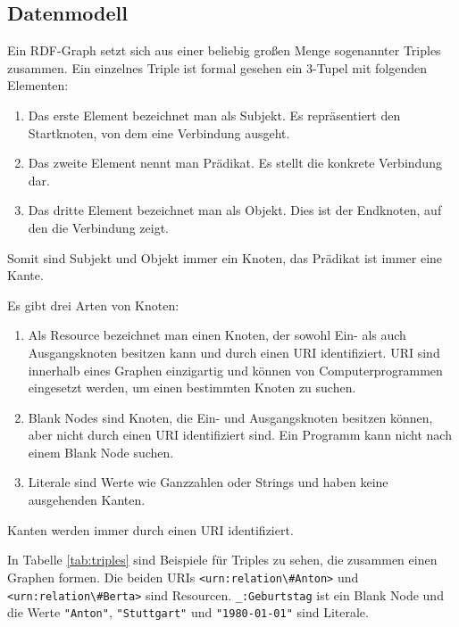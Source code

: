 \subsection{Datenmodell}

Ein RDF-Graph setzt sich aus einer beliebig großen Menge sogenannter Triples zusammen. \cite[vgl.][Sektion 3.1]{w3c2014rdfconcepts} Ein einzelnes Triple ist formal gesehen ein 3-Tupel mit folgenden Elementen:
\begin{enumerate}
	\item Das erste Element bezeichnet man als Subjekt. Es repräsentiert den Startknoten, von dem eine Verbindung ausgeht.
	\item Das zweite Element nennt man Prädikat. Es stellt die konkrete Verbindung dar.
	\item Das dritte Element bezeichnet man als Objekt. Dies ist der Endknoten, auf den die Verbindung zeigt. 
\end{enumerate}

Somit sind Subjekt und Objekt immer ein Knoten, das Prädikat ist immer eine Kante.

Es gibt drei Arten von Knoten:
\begin{enumerate}
	\item Als Resource bezeichnet man einen Knoten, der sowohl Ein- als auch Ausgangsknoten besitzen kann und durch einen URI identifiziert. URI sind innerhalb eines Graphen einzigartig und können von Computerprogrammen eingesetzt werden, um einen bestimmten Knoten zu suchen.
	\item Blank Nodes sind Knoten, die Ein- und Ausgangsknoten besitzen können, aber nicht durch einen URI identifiziert sind. Ein Programm kann nicht nach einem Blank Node suchen.
	\item Literale sind Werte wie Ganzzahlen oder Strings und haben keine ausgehenden Kanten.	
\end{enumerate}
Kanten werden immer durch einen URI identifiziert.

In Tabelle \ref{tab:triples} sind Beispiele für Triples zu sehen, die zusammen einen Graphen formen. Die beiden URIs \lstinline|<urn:relation\#Anton>| und \lstinline|<urn:relation\#Berta>| sind Resourcen. \lstinline|_:Geburtstag| ist ein Blank Node und die Werte \lstinline|"Anton"|, \lstinline|"Stuttgart"| und \lstinline|"1980-01-01"| sind Literale.



